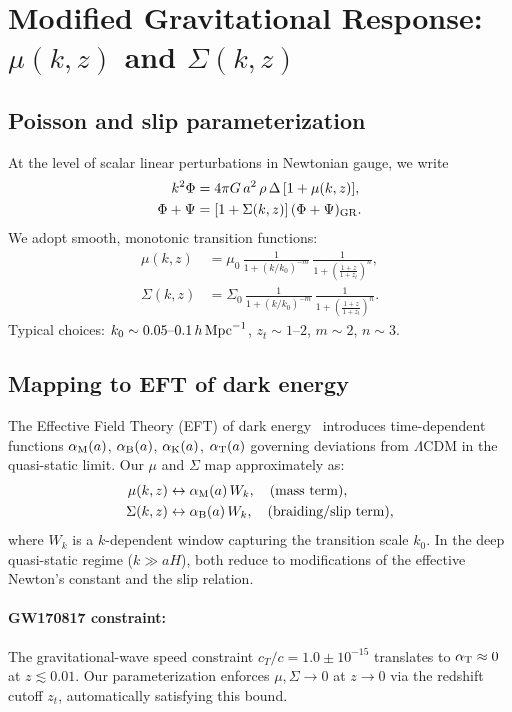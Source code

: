 \documentclass[11pt]{article}
\begin{document}
\section{Modified Gravitational Response: $\mu(k,z)$ and $\Sigma(k,z)$}

\subsection{Poisson and slip parameterization}

At the level of scalar linear perturbations in Newtonian gauge, we write
\begin{align}
k^2\Phi &= 4\pi G\,a^2\,\rho\,\Delta\,[1+\mu(k,z)], \label{eq:poisson_mu}\\
\Phi + \Psi &= [1+\Sigma(k,z)]\,(\Phi+\Psi)_{\rm GR}. \label{eq:slip_sigma}
\end{align}
We adopt smooth, monotonic transition functions:
\begin{align}
\mu(k,z) &= \mu_0\,\frac{1}{1+(k/k_0)^{-m}}\,\frac{1}{1+\left(\frac{1+z}{1+z_t}\right)^n}, \label{eq:mu_form}\\
\Sigma(k,z) &= \Sigma_0\,\frac{1}{1+(k/k_0)^{-m}}\,\frac{1}{1+\left(\frac{1+z}{1+z_t}\right)^n}. \label{eq:sigma_form}
\end{align}
Typical choices: $k_0\sim 0.05\text{--}0.1\,h\,{\rm Mpc}^{-1}$, $z_t\sim 1\text{--}2$, $m\sim 2$, $n\sim 3$.

\subsection{Mapping to EFT of dark energy}

The Effective Field Theory (EFT) of dark energy~\citep{Bellini2014_effective} introduces time-dependent functions $\alpha_{\rm M}(a)$, $\alpha_{\rm B}(a)$, $\alpha_{\rm K}(a)$, $\alpha_{\rm T}(a)$ governing deviations from $\Lambda$CDM in the quasi-static limit.
Our $\mu$ and $\Sigma$ map approximately as:
\begin{align}
\mu(k,z) &\leftrightarrow \alpha_{\rm M}(a)\,W_k, \quad (\text{mass term}),\\
\Sigma(k,z) &\leftrightarrow \alpha_{\rm B}(a)\,W_k, \quad (\text{braiding/slip term}),
\end{align}
where $W_k$ is a $k$-dependent window capturing the transition scale $k_0$.
In the deep quasi-static regime ($k\gg aH$), both reduce to modifications of the effective Newton's constant and the slip relation.

\paragraph{GW170817 constraint:}
The gravitational-wave speed constraint $c_T/c = 1.0\pm 10^{-15}$ translates to $\alpha_{\rm T}\approx 0$ at $z\lesssim 0.01$.
Our parameterization enforces $\mu,\Sigma\to 0$ at $z\to 0$ via the redshift cutoff $z_t$, automatically satisfying this bound.
\end{document}
